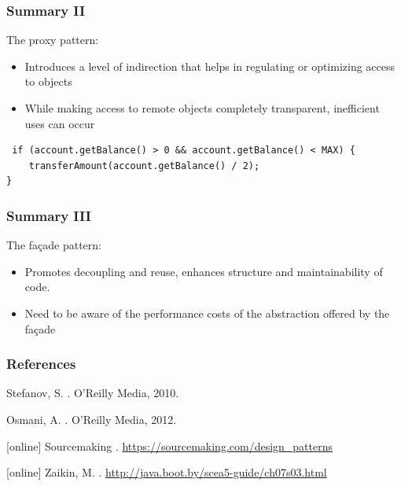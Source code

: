 \documentclass{beamer}
\begin{document}
\begin{frame}[fragile]
\frametitle{Summary II}
 The proxy pattern:
 \begin{itemize}
\item Introduces a level of indirection that helps in regulating or optimizing access to objects
\item While making access to remote objects completely transparent, inefficient uses can occur
 \end{itemize}
 \begin{lstlisting}
 if (account.getBalance() > 0 && account.getBalance() < MAX) {
    transferAmount(account.getBalance() / 2);
}
 \end{lstlisting}
\end{frame}

\begin{frame}[fragile]
\frametitle{Summary III}
 The fa\c{c}ade pattern:
\begin{itemize}
  \item Promotes decoupling and reuse, enhances structure and maintainability of code.
  \item Need to be aware of the performance costs of the abstraction offered by the fa\c{c}ade
  \end{itemize}
\end{frame}

\begin{frame}
  \frametitle{References}    
  \begin{thebibliography}{5}    
  
  \beamertemplatebookbibitems
   Stefanov, S.
    .
    \newblock O'Reilly Media, 2010.
  
  \beamertemplatebookbibitems
   Osmani, A.
    .
    \newblock O'Reilly Media, 2012.
  
  [online]
   Sourcemaking
  .
  \newblock \url{https://sourcemaking.com/design_patterns}
  
  [online]
   Zaikin, M. 
  .
  \newblock \url{http://java.boot.by/scea5-guide/ch07s03.html}
 
  \end{thebibliography}
\end{frame}
\end{document}
